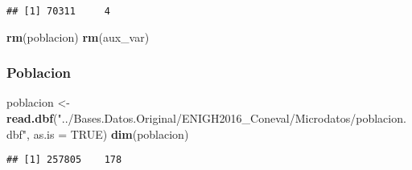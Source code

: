 \documentclass[11pt,]{article}
\newenvironment{Shaded}{\begin{snugshade}}{\end{snugshade}}
\newcommand{\KeywordTok}[1]{\textcolor[rgb]{0.13,0.29,0.53}{\textbf{#1}}}
\newcommand{\DataTypeTok}[1]{\textcolor[rgb]{0.13,0.29,0.53}{#1}}
\newcommand{\StringTok}[1]{\textcolor[rgb]{0.31,0.60,0.02}{#1}}
\newcommand{\OtherTok}[1]{\textcolor[rgb]{0.56,0.35,0.01}{#1}}
\newcommand{\NormalTok}[1]{#1}
\begin{document}
\begin{verbatim}
## [1] 70311     4
\end{verbatim}

\begin{Shaded}
\begin{Highlighting}[]
\KeywordTok{rm}\NormalTok{(poblacion)}
\KeywordTok{rm}\NormalTok{(aux_var)}
\end{Highlighting}
\end{Shaded}

\subsubsection{Poblacion}\label{poblacion}

\begin{Shaded}
\begin{Highlighting}[]
\NormalTok{poblacion <-}\StringTok{ }\KeywordTok{read.dbf}\NormalTok{(}\StringTok{"../Bases.Datos.Original/ENIGH2016_Coneval/Microdatos/poblacion.dbf"}\NormalTok{, }
                       \DataTypeTok{as.is =} \OtherTok{TRUE}\NormalTok{)}
\KeywordTok{dim}\NormalTok{(poblacion)}
\end{Highlighting}
\end{Shaded}

\begin{verbatim}
## [1] 257805    178
\end{verbatim}
\end{document}
